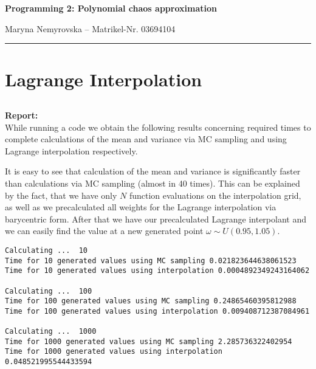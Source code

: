 \documentclass[11pt]{article}
\newcommand{\subass}{\subsection{}}
\newcommand{\report}{\textbf{Report: \\}}
\newcommand{\hwhead}[4]{
\begin{center}
\sffamily\large\bfseries Programming 2: Polynomial chaos approximation
\vspace{2mm} 
\normalfont

#2 -- #3 %
\end{center}
\vspace{6mm} \hrule \vspace{4mm}
}
\newcommand{\name}{Maryna Nemyrovska} %
\newcommand{\imat}{ Matrikel-Nr. 03694104} %
\begin{document}
\hwhead{xx}{\name}{\imat}{\email}


\section{Lagrange Interpolation} %
\subass
\report
While running a code we obtain the following results concerning required times to complete calculations of the mean and variance via MC sampling and using Lagrange interpolation respectively.\par
It is easy to see that calculation of the mean and variance is significantly faster than calculations via MC sampling (almost in 40 times).
This can be explained by the fact, that we have only $N$ function evaluations on the interpolation grid, as well as we precalculated all weights for the Lagrange interpolation via barycentric form. After that we have our precalculated Lagrange interpolant and we can easily find the value at a new generated point $\omega \sim U(0.95, 1.05)$.

\begin{lstlisting}
Calculating ...  10
Time for 10 generated values using MC sampling 0.021823644638061523
Time for 10 generated values using interpolation 0.0004892349243164062

Calculating ...  100
Time for 100 generated values using MC sampling 0.24865460395812988
Time for 100 generated values using interpolation 0.009408712387084961

Calculating ...  1000
Time for 1000 generated values using MC sampling 2.285736322402954
Time for 1000 generated values using interpolation 0.048521995544433594
\end{lstlisting}
\end{document}
